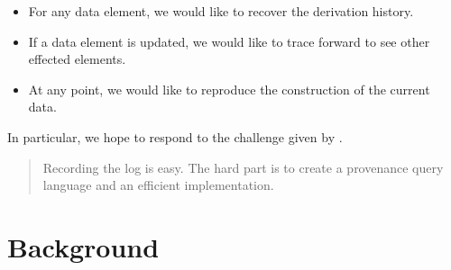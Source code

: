 \documentclass[11pt]{article}
\begin{document}
\begin{itemize}
\item For any data element, we would like to recover the derivation history. 
\item If a data element is updated, we would like to trace forward to see other effected elements.
\item At any point, we would like to reproduce the construction of the current data. 
\end{itemize}

In particular, we hope to respond to the challenge given by \cite{cudré2009demonstration}.

\begin{quote}
Recording the log is easy. The hard part is to create a provenance query language and an efficient implementation.  
\end{quote}

\section{Background}

% 
% 
% 
% 
% 
% 
\end{document}
